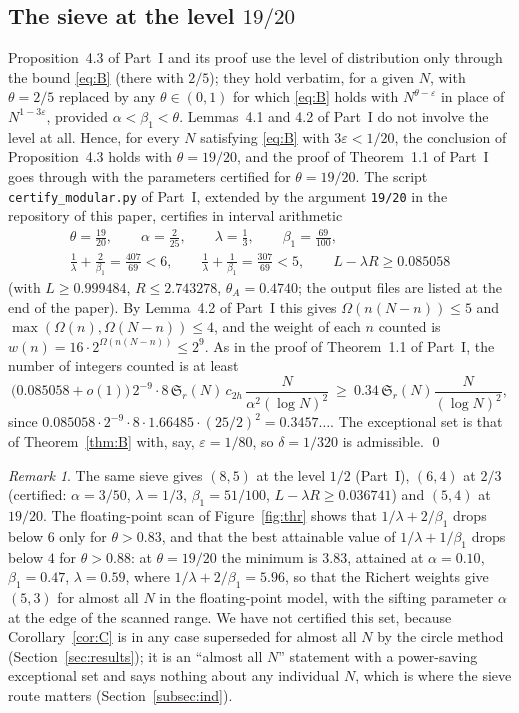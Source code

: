 ﻿\documentclass[11pt]{amsart}
\theoremstyle{remark}
\newtheorem{remark}[theorem]{Remark}
\newcommand{\Sg}{\mathfrak{S}}
\newcommand{\e}{\varepsilon}
\begin{document}
\subsection{The sieve at the level $19/20$}
Proposition~4.3 of Part~I and its proof use the level of distribution only through the bound \eqref{eq:B} (there with $2/5$); they hold verbatim, for a given $N$, with $\theta=2/5$ replaced by any $\theta\in(0,1)$ for which \eqref{eq:B} holds with $N^{\theta-\e}$ in place of $N^{1-3\e}$, provided $\alpha<\beta_1<\theta$. Lemmas~4.1 and 4.2 of Part~I do not involve the level at all. Hence, for every $N$ satisfying \eqref{eq:B} with $3\e<1/20$, the conclusion of Proposition~4.3 holds with $\theta=19/20$, and the proof of Theorem~1.1 of Part~I goes through with the parameters certified for $\theta=19/20$. The script \texttt{certify\_modular.py} of Part~I, extended by the argument \texttt{19/20} in the repository of this paper, certifies in interval arithmetic
\begin{gather*}
\theta=\tfrac{19}{20},\qquad\alpha=\tfrac2{25},\qquad\lambda=\tfrac13,\qquad\beta_1=\tfrac{69}{100},\\
\tfrac1\lambda+\tfrac2{\beta_1}=\tfrac{407}{69}<6,\qquad \tfrac1\lambda+\tfrac1{\beta_1}=\tfrac{307}{69}<5,\qquad L-\lambda R\ge0.085058
\end{gather*}
(with $L\ge0.999484$, $R\le2.743278$, $\theta_A=0.4740$; the output files are listed at the end of the paper). By Lemma~4.2 of Part~I this gives $\Omega(n(N-n))\le5$ and $\max(\Omega(n),\Omega(N-n))\le4$, and the weight of each $n$ counted is $w(n)=16\cdot2^{\Omega(n(N-n))}\le2^{9}$. As in the proof of Theorem~1.1 of Part~I, the number of integers counted is at least
\[
\bigl(0.085058+o(1)\bigr)\,2^{-9}\cdot8\,\Sg_r(N)\,c_{2h}\,\frac{N}{\alpha^2(\log N)^2}\ \ge\ 0.34\,\Sg_r(N)\frac{N}{(\log N)^2},
\]
since $0.085058\cdot2^{-9}\cdot8\cdot1.66485\cdot(25/2)^2=0.3457\ldots$. The exceptional set is that of Theorem~\ref{thm:B} with, say, $\e=1/80$, so $\delta=1/320$ is admissible. \qed

\begin{remark}
The same sieve gives $(8,5)$ at the level $1/2$ (Part~I), $(6,4)$ at $2/3$ (certified: $\alpha=3/50$, $\lambda=1/3$, $\beta_1=51/100$, $L-\lambda R\ge0.036741$) and $(5,4)$ at $19/20$. The floating-point scan of Figure~\ref{fig:thr} shows that $1/\lambda+2/\beta_1$ drops below $6$ only for $\theta>0.83$, and that the best attainable value of $1/\lambda+1/\beta_1$ drops below $4$ for $\theta>0.88$: at $\theta=19/20$ the minimum is $3.83$, attained at $\alpha=0.10$, $\beta_1=0.47$, $\lambda=0.59$, where $1/\lambda+2/\beta_1=5.96$, so that the Richert weights give $(5,3)$ for almost all $N$ in the floating-point model, with the sifting parameter $\alpha$ at the edge of the scanned range. We have not certified this set, because Corollary~\ref{cor:C} is in any case superseded for almost all $N$ by the circle method (Section~\ref{sec:results}); it is an ``almost all $N$'' statement with a power-saving exceptional set and says nothing about any individual $N$, which is where the sieve route matters (Section~\ref{subsec:ind}).
\end{remark}
\end{document}
